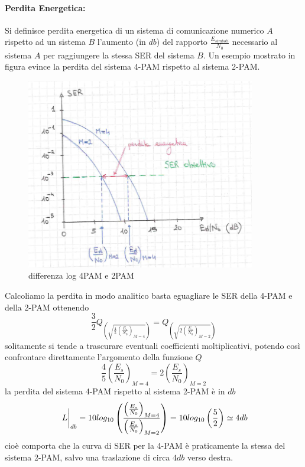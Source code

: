             \paragraph{Perdita Energetica: } Si definisce perdita energetica di un sistema di comunicazione numerico $A$ rispetto
                ad un sistema $B$ l'aumento (in $db$) del rapporto $\frac{E_{simboli}}{N_0}$ necessario al sistema $A$ per 
                raggiungere la stessa SER del sistema $B$. Un esempio mostrato in figura evince la perdita del sistema 
                4-PAM rispetto al sistema 2-PAM.
                \begin{figure}[H]
                    \centering
                    \includegraphics[width = 10cm]{media/comparazione errore ser.png}
                    \caption{differenza log 4PAM e 2PAM}
                \end{figure}  
                Calcoliamo la perdita in modo analitico basta eguagliare le SER della 4-PAM e della
                2-PAM ottenendo
                \[
                    \frac{3}{2}Q_{\displaystyle\left(\sqrt{\frac{4}{5}\left(\frac{E_s}{N_0}\right)_{M=4}}\right)} =Q_{\displaystyle\left(\sqrt{2\left(\frac{E_s}{N_0}\right)_{M=2}}\right)}      
                \]
                solitamente si tende a trascurare eventuali coefficienti moltiplicativi, potendo così confrontare direttamente
                l'argomento della funzione $Q$
                \[
                    \frac{4}{5}\left(\frac{E_s}{N_0}\right)_{M=4} =2\left(\frac{E_s}{N_0}\right)_{M=2}          
                \]
                la perdita del sistema 4-PAM rispetto al sistema 2-PAM è in $db$
                \[
                    \eval*{L}_{db} = 10log_{10}\left(\frac{\left(\frac{E_s}{N_0}\right)_{M=4}}{\left(\frac{E_s}{N_0}\right)_{M=2}}\right) = 10log_{10}\left(\frac{5}{2}\right) \simeq 4db    
                \]
                cioè comporta che la curva di SER per la 4-PAM è praticamente la stessa del sistema 2-PAM, salvo una traslazione di
                circa $4db$ verso destra.
